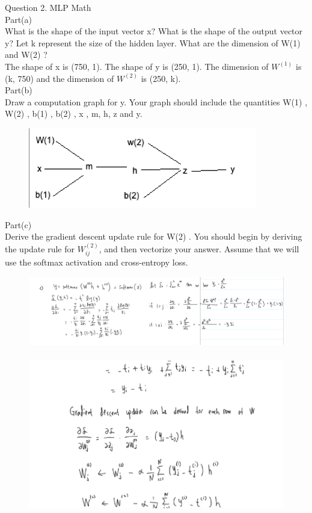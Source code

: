 \documentclass[12pt]{article}
\begin{document}
Question 2. MLP Math\\

Part(a)\\
What is the shape of the input vector  x? What is the shape of the output vector  y? Let  k  represent the size of the hidden layer. What are the dimension of  W(1)  and  W(2) ?\\
The shape of x is (750, 1). The shape of y is (250, 1). The dimension of $W^{(1)}$ is (k, 750) and the dimension of $W^{(2)}$ is (250, k).\\

Part(b)\\
Draw a computation graph for  y. Your graph should include the quantities  W(1) ,  W(2) ,  b(1) ,  b(2) ,  x ,  m,  h,  z  and  y.\\
\begin{figure}[H]
    \centering
    \includegraphics[width=100mm,scale=1]{2}\

\end{figure}


Part(c)\\
Derive the gradient descent update rule for  W(2) . You should begin by deriving the update rule for  $W_{ij}^{(2)} $, and then vectorize your answer. Assume that we will use the softmax activation and cross-entropy loss.\\
\begin{figure}[H]
    \centering
    \includegraphics[width=170mm,scale=2]{2c1}\
    \includegraphics[width=170mm,scale=1.5]{2c2}\

\end{figure}
\end{document}
